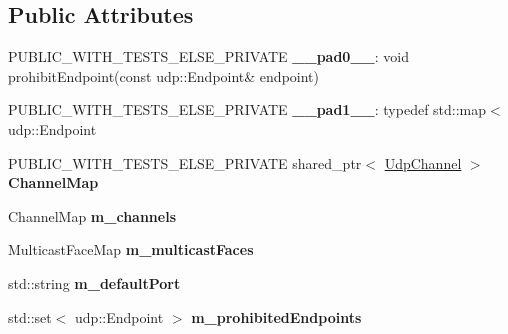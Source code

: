 \subsection*{Public Attributes}
\begin{DoxyCompactItemize}
\item 
P\+U\+B\+L\+I\+C\+\_\+\+W\+I\+T\+H\+\_\+\+T\+E\+S\+T\+S\+\_\+\+E\+L\+S\+E\+\_\+\+P\+R\+I\+V\+A\+TE {\bfseries \+\_\+\+\_\+pad0\+\_\+\+\_\+}\+: void prohibit\+Endpoint(const udp\+::\+Endpoint\& endpoint)\hypertarget{classnfd_1_1UdpFactory_ab5a5c239c8d82073ccce8bd390f3b184}{}\label{classnfd_1_1UdpFactory_ab5a5c239c8d82073ccce8bd390f3b184}

\item 
P\+U\+B\+L\+I\+C\+\_\+\+W\+I\+T\+H\+\_\+\+T\+E\+S\+T\+S\+\_\+\+E\+L\+S\+E\+\_\+\+P\+R\+I\+V\+A\+TE {\bfseries \+\_\+\+\_\+pad1\+\_\+\+\_\+}\+: typedef std\+::map$<$udp\+::\+Endpoint\hypertarget{classnfd_1_1UdpFactory_af36a56f61e46546b13bb1864a9392d1c}{}\label{classnfd_1_1UdpFactory_af36a56f61e46546b13bb1864a9392d1c}

\item 
P\+U\+B\+L\+I\+C\+\_\+\+W\+I\+T\+H\+\_\+\+T\+E\+S\+T\+S\+\_\+\+E\+L\+S\+E\+\_\+\+P\+R\+I\+V\+A\+TE shared\+\_\+ptr$<$ \hyperlink{classnfd_1_1UdpChannel}{Udp\+Channel} $>$ {\bfseries Channel\+Map}\hypertarget{classnfd_1_1UdpFactory_a1fc807b230780e23bc9c3eb6d7809460}{}\label{classnfd_1_1UdpFactory_a1fc807b230780e23bc9c3eb6d7809460}

\item 
Channel\+Map {\bfseries m\+\_\+channels}\hypertarget{classnfd_1_1UdpFactory_a7785237f5654e5e98f9b7f66ca85922a}{}\label{classnfd_1_1UdpFactory_a7785237f5654e5e98f9b7f66ca85922a}

\item 
Multicast\+Face\+Map {\bfseries m\+\_\+multicast\+Faces}\hypertarget{classnfd_1_1UdpFactory_aeb5028bde1e9bae8bd792a316477edd1}{}\label{classnfd_1_1UdpFactory_aeb5028bde1e9bae8bd792a316477edd1}

\item 
std\+::string {\bfseries m\+\_\+default\+Port}\hypertarget{classnfd_1_1UdpFactory_a62c918916b42cff4914489c382d372de}{}\label{classnfd_1_1UdpFactory_a62c918916b42cff4914489c382d372de}

\item 
std\+::set$<$ udp\+::\+Endpoint $>$ {\bfseries m\+\_\+prohibited\+Endpoints}\hypertarget{classnfd_1_1UdpFactory_afc002c9f0b919480c0f6dcd57e61c948}{}\label{classnfd_1_1UdpFactory_afc002c9f0b919480c0f6dcd57e61c948}

\end{DoxyCompactItemize}


